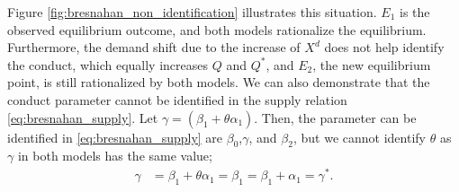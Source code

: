 \documentclass[11pt, a4paper]{article}
\theoremstyle{remark}
\begin{document}
Figure \ref{fig:bresnahan_non_identification} illustrates this situation.
$E_1$ is the observed equilibrium outcome, and both models rationalize the equilibrium.
Furthermore, the demand shift due to the increase of $X^d$ does not help identify the conduct, which equally increases $Q$ and $Q^{*}$, and $E_2$, the new equilibrium point, is still rationalized by both models.
We can also demonstrate that the conduct parameter cannot be identified in the supply relation \eqref{eq:bresnahan_supply}.
Let $\gamma = (\beta_1 + \theta \alpha_1)$.
Then, the parameter can be identified  in \eqref{eq:bresnahan_supply} are $\beta_0$,$\gamma$, and $\beta_2$, but we cannot identify $\theta$ as $\gamma$ in both models has the same value; 
\begin{align}
    \gamma &= \beta_1 + \theta \alpha_1 = \beta_1 = \beta_1 + \alpha_1 = \gamma^{*}.
\end{align}
\end{document}
